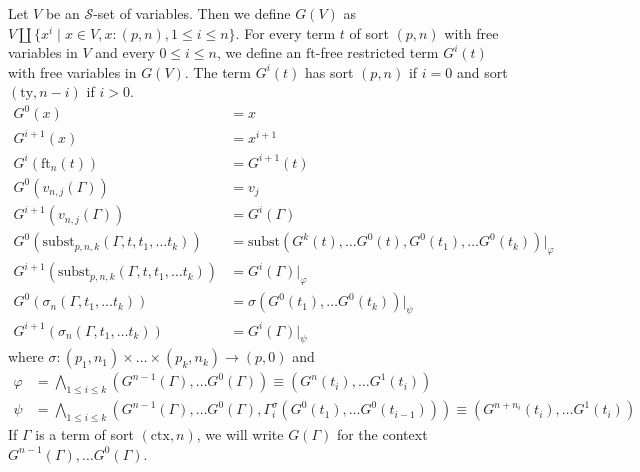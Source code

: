\documentclass[reqno]{amsart}
\theoremstyle{definition}
\theoremstyle{remark}
\newcommand{\fs}[1]{\mathrm{#1}}
\newcommand{\subst}{\fs{subst}}
\newcommand{\ft}{\fs{ft}}
\newcommand{\ty}{\fs{ty}}
\newcommand{\ctx}{\fs{ctx}}
\numberwithin{figure}{section}
\begin{document}
Let $V$ be an $\mathcal{S}$-set of variables.
Then we define $G(V)$ as $V \amalg \{ x^i \mid x \in V, x : (p,n), 1 \leq i \leq n \}$.
For every term $t$ of sort $(p,n)$ with free variables in $V$ and every $0 \leq i \leq n$, we define an $\ft$-free restricted term $G^i(t)$ with free variables in $G(V)$.
The term $G^i(t)$ has sort $(p,n)$ if $i = 0$ and sort $(\ty,n-i)$ if $i > 0$.
\begin{align*}
G^0(x) & = x \\
G^{i+1}(x) & = x^{i+1} \\
G^i(\ft_n(t)) & = G^{i+1}(t) \\
G^0(v_{n,j}(\Gamma)) & = v_j \\
G^{i+1}(v_{n,j}(\Gamma)) & = G^i(\Gamma) \\
G^0(\subst_{p,n,k}(\Gamma, t, t_1, \ldots t_k)) & = \subst(G^k(t), \ldots G^0(t), G^0(t_1), \ldots G^0(t_k))|_\varphi \\
G^{i+1}(\subst_{p,n,k}(\Gamma, t, t_1, \ldots t_k)) & = G^i(\Gamma)|_\varphi \\
G^0(\sigma_n(\Gamma, t_1, \ldots t_k)) & = \sigma(G^0(t_1), \ldots G^0(t_k))|_\psi \\
G^{i+1}(\sigma_n(\Gamma, t_1, \ldots t_k)) & = G^i(\Gamma)|_\psi
\end{align*}
where $\sigma : (p_1,n_1) \times \ldots \times (p_k,n_k) \to (p,0)$ and
\begin{align*}
\varphi & = \bigwedge_{1 \leq i \leq k} (G^{n-1}(\Gamma), \ldots G^0(\Gamma)) \equiv (G^n(t_i), \ldots G^1(t_i)) \\
\psi & = \bigwedge_{1 \leq i \leq k} (G^{n-1}(\Gamma), \ldots G^0(\Gamma), \Gamma^\sigma_i(G^0(t_1), \ldots G^0(t_{i-1}))) \equiv (G^{n+n_i}(t_i), \ldots G^1(t_i))
\end{align*}
If $\Gamma$ is a term of sort $(\ctx,n)$, we will write $G(\Gamma)$ for the context $G^{n-1}(\Gamma), \ldots G^0(\Gamma)$.
\end{document}
